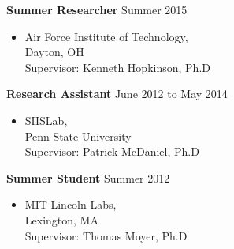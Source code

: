 \documentclass[10pt]{article}
\newenvironment{innerlist}[1][\enskip\textbullet]%
        {\begin{itemize}[#1,leftmargin=*,parsep=0pt,itemsep=0pt,topsep=0pt,partopsep=0pt]}
        {\end{itemize}}
\begin{document}
\textbf{Summer Researcher} \hfill {Summer 2015}
\begin{innerlist}

\item[] Air Force Institute of Technology,\\
        Dayton, OH\\
        Supervisor: Kenneth Hopkinson, Ph.D
\end{innerlist}
\textbf{Research Assistant} \hfill {June 2012 to May 2014}
\begin{innerlist}

\item[] SIISLab,\\
        Penn State University\\
        Supervisor: Patrick McDaniel, Ph.D
\end{innerlist}
\textbf{Summer Student} \hfill {Summer 2012}
\begin{innerlist}

\item[] MIT Lincoln Labs,\\
        Lexington, MA\\
        Supervisor: Thomas Moyer, Ph.D
\end{innerlist}
\end{document}
